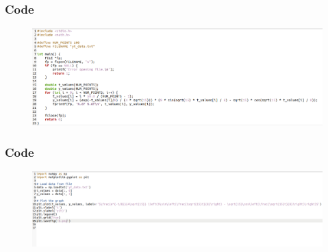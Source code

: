 \documentclass{beamer}
\begin{document}
\begin{frame}
\frametitle{Code}
\begin{figure}[ht]
                        \centering
                        \includegraphics[width=\columnwidth]{figs/1.png}
                        \label{fig:1.1}
\end{figure}
\end{frame}

\begin{frame}
\frametitle{Code}
\begin{figure}[ht]
                        \centering
                        \includegraphics[width=\columnwidth]{figs/2.png}
                        \label{fig:1.2}
\end{figure}
\end{frame}
\end{document}
